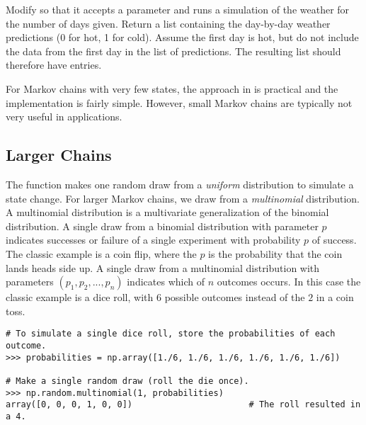 \begin{problem} %
Modify  so that it accepts a parameter  and runs a simulation of the weather for the number of days given.
Return a list containing the day-by-day weather predictions (0 for hot, 1 for cold).
Assume the first day is hot, but do not include the data from the first day in the list of predictions.
The resulting list should therefore have  entries.
\end{problem}

For Markov chains with very few states, the approach in  is practical and the implementation is fairly simple.
However, small Markov chains are typically not very useful in applications.

\subsection*{Larger Chains} %

The  function makes one random draw from a \emph{uniform} distribution to simulate a state change.
For larger Markov chains, we draw from a \emph{multinomial} distribution.
A multinomial distribution is a multivariate generalization of the binomial distribution.
A single draw from a binomial distribution with parameter $p$ indicates successes or failure of a single experiment with probability $p$ of success.
The classic example is a coin flip, where the $p$ is the probability that the coin lands heads side up.
A single draw from a multinomial distribution with parameters $\left(p_1, p_2, ..., p_n \right)$ indicates which of $n$ outcomes occurs.
In this case the classic example is a dice roll, with $6$ possible outcomes instead of the $2$ in a coin toss.

\begin{lstlisting}
# To simulate a single dice roll, store the probabilities of each outcome.
>>> probabilities = np.array([1./6, 1./6, 1./6, 1./6, 1./6, 1./6])

# Make a single random draw (roll the die once).
>>> np.random.multinomial(1, probabilities)         
array([0, 0, 0, 1, 0, 0])                       # The roll resulted in a 4.
\end{lstlisting}

